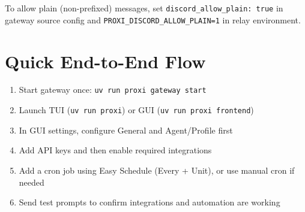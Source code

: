 \documentclass{article}
\begin{document}
To allow plain (non-prefixed) messages, set \texttt{discord\_allow\_plain: true} in gateway source config and \texttt{PROXI\_DISCORD\_ALLOW\_PLAIN=1} in relay environment.

\section{Quick End-to-End Flow}

\begin{enumerate}
	\item Start gateway once: \texttt{uv run proxi gateway start}
	\item Launch TUI (\texttt{uv run proxi}) or GUI (\texttt{uv run proxi frontend})
	\item In GUI settings, configure General and Agent/Profile first
	\item Add API keys and then enable required integrations
	\item Add a cron job using Easy Schedule (Every + Unit), or use manual cron if needed
	\item Send test prompts to confirm integrations and automation are working
\end{enumerate}
\end{document}
